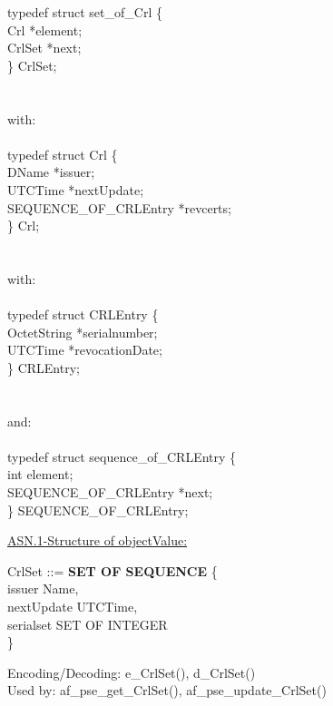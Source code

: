 {\small
\bvtab
\4      typedef struct set\_of\_Crl \{ \\
\6              Crl   \3 *element; \\
\6              CrlSet   \3 *next; \\
\4      \} CrlSet; \\ \\ \\
with: \\ \\
\4      typedef struct Crl \{ \\
\5              DName          \5 *issuer; \\
\5              UTCTime        \5 *nextUpdate; \\
\5              SEQUENCE\_OF\_CRLEntry     \5 *revcerts; \\
\4      \} Crl;  \\ \\ \\
with: \\ \\
\4      typedef struct CRLEntry \{ \\
\5              OctetString          \5 *serialnumber; \\
\5              UTCTime        \5 *revocationDate; \\
\4      \} CRLEntry;  \\ \\ \\
and: \\ \\
\4      typedef struct sequence\_of\_CRLEntry \{ \\
\5              int          \5 element; \\
\5              SEQUENCE\_OF\_CRLEntry \5 *next; \\
\4      \} SEQUENCE\_OF\_CRLEntry;  \\
\evtab
}


\underline{ASN.1-Structure of objectValue:}

{\small
\bvtab
\3 CrlSet ::= \3 {\bf SET OF SEQUENCE} \{  \\
\7 issuer          \3 Name,                    \\
\7 nextUpdate      \3 UTCTime,                \\
\7 serialset       \3 SET OF INTEGER          \\
\6 \}
\evtab
}
 
Encoding/Decoding: e\_CrlSet(), d\_CrlSet() \\
Used by: af\_pse\_get\_CrlSet(), af\_pse\_update\_CrlSet()


